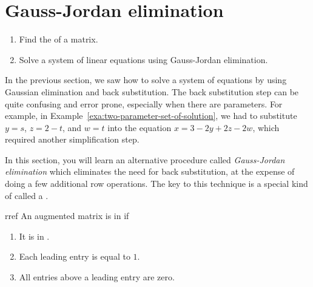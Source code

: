 \section{Gauss-Jordan elimination}

\begin{outcome}
  \begin{enumerate}
  \item Find the {\rref} of a matrix.
  \item Solve a system of linear equations using Gauss-Jordan elimination.
  \end{enumerate}
\end{outcome}

In the previous section, we saw how to solve a system of equations by
using Gaussian elimination and back substitution. The back
substitution step can be quite confusing and error prone, especially
when there are parameters. For example, in
Example~\ref{exa:two-parameter-set-of-solution}, we had to substitute $y=s$,
$z=2-t$, and $w=t$ into the equation $x=3-2y+2z-2w$, which required
another simplification step.

In this section, you will learn an alternative procedure called {\em
  Gauss-Jordan elimination} which eliminates the need for back
substitution, at the expense of doing a few additional row operations.
The key to this technique is a special kind of {\ef} called a
{\em {\rref}}.

\begin{definition}{\Rref}{rref}
  An augmented matrix is in \textbf{\rref}\eindex{\rref} if

  \begin{enumerate}
  \item It is in {\ef}.

  \item Each leading entry is equal to $1$.

  \item All entries above a leading entry are zero.
  \end{enumerate}
\end{definition}

